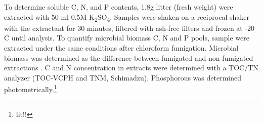 \documentclass[authoryear,preprint,review,12pt]{elsarticle}
\begin{document}
                                                                                                                                                                                                                                                                                                                                                                                                                                                                                                                                                                                                                                                                                                                                                                                                                                                                                                                                                                                                                                                                                                                              To determine soluble C, N, and P contents, 1.8g litter (fresh weight) were extracted with 50 ml 0.5M K\textsubscript{2}SO\textsubscript{4}. Samples were shaken on a reciprocal shaker with the extractant for 30 minutes, filtered with ash-free filters and frozen at -20 \textdegree C until analysis. To quantify microbial biomass C, N and P pools, sample were extracted under the same conditions after chloroform fumigation. Microbial biomass was determined as the difference between fumigated and non-fumigated extractions \citep{Schinner1996}. C and N concentration in extracts were determined with a TOC/TN analyzer (TOC-VCPH and TNM, Schimadzu), Phosphorous was determined photometrically.\footnote{lit!!}
\end{document}
